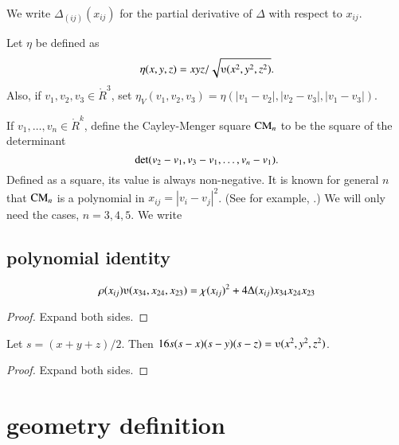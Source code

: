 We write $\Delta_{(ij)}(x_{ij})$ for the partial derivative of $\Delta$
with respect to $x_{ij}$.



\begin{definition}
%
Let $\eta$ be defined as
	$$\eta(x,y,z) = x y z/\sqrt{\ups(x^2,y^2,z^2)}.$$
Also, if $v_1,v_2,v_3\in\ring{R}^3$, set
   $\eta_V(v_1,v_2,v_3) =\eta(|v_1-v_2|,|v_2-v_3|,|v_1-v_3|)$.
\end{definition}

\begin{definition}
If $v_1,\ldots,v_n\in\ring{R}^k$, define
the Cayley-Menger square ${\operatorname{CM}}_n$
to be the square
of the determinant
	$${\operatorname{det}}(v_2-v_1,v_3-v_1,\ldots,v_n-v_1).$$
Defined as a square, its value is always non-negative.
It is known for general $n$ that ${\operatorname{CM}}_n$ is a polynomial in
$x_{ij} = |v_i-v_j|^2$.  (See for example,
\cite{EZ}.)
We will only need the cases, $n=3,4,5$.   We write
\end{definition}

\subsection{polynomial identity}

\begin{lemma}
  $$\rho(x_{ij}) \ups(x_{34},x_{24},x_{23}) = \chi(x_{ij})^2 +
  4 \Delta(x_{ij}) x_{34} x_{24} x_{23}$$
\end{lemma}

\begin{proof} Expand both sides.
\end{proof}

\begin{lemma}
Let $s = (x+y+z)/2$.  Then $16 s(s-x)(s-y)(s-z) = \ups(x^2,y^2,z^2)$.
\end{lemma}

\begin{proof} Expand both sides. 
\end{proof}




\newpage

\section{geometry definition}  


